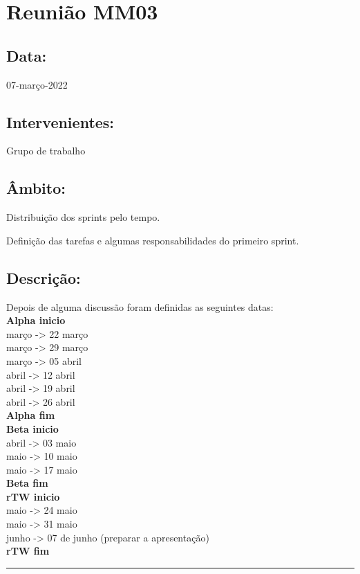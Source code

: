 \section{Reunião MM03}\label{reuniaoMM03}

\subsection*{Data:}
07-março-2022

\subsection*{Intervenientes:}
Grupo de trabalho

\subsection*{Âmbito:}
Distribuição  dos sprints pelo tempo.

Definição das tarefas e algumas responsabilidades do primeiro sprint.

\subsection*{Descrição:}
Depois de alguma discussão foram definidas as seguintes datas:  \\[5mm]
\quad \textbf{Alpha inicio}\\[1mm]
 março -> 22 março\\[1mm]
 março -> 29 março\\[1mm]
 março -> 05 abril\\[1mm]
 abril -> 12 abril\\[1mm]
 abril -> 19 abril\\[1mm]
 abril -> 26 abril\\[1mm]
\quad \textbf{Alpha fim} \\[5mm]
\quad \textbf{Beta inicio}\\[1mm]
 abril -> 03 maio\\[1mm]
 maio -> 10 maio\\[1mm]
 maio -> 17 maio\\[1mm]
\quad \textbf{Beta fim}\\[5mm]
\quad \textbf{rTW inicio}\\[1mm]
 maio -> 24 maio\\[1mm]
 maio -> 31 maio\\[1mm]
 junho -> 07 de junho (preparar a apresentação) \\[1mm]
\quad \textbf{rTW fim} \\[5mm]

\noindent \rule{\linewidth}{0.4pt}
\newline
